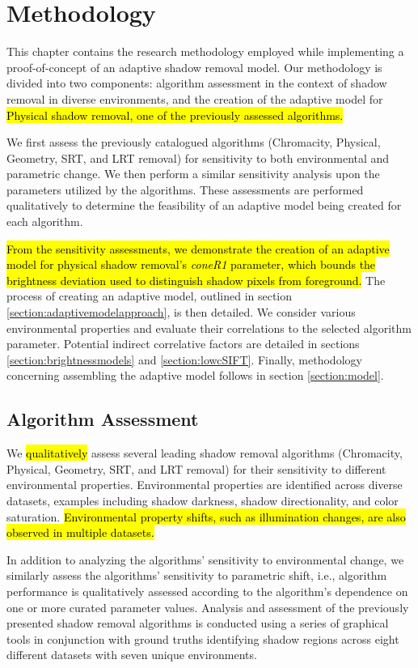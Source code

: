 \clearpage
\chapter{Methodology} \label{chapter:methodology}

This chapter contains the research methodology employed while implementing a proof-of-concept of an adaptive shadow removal model. Our methodology is divided into two components: algorithm assessment in the context of shadow removal in diverse environments, and the creation of the adaptive model for \hl{Physical shadow removal, one of the previously assessed algorithms.} 

We first assess the previously catalogued algorithms (Chromacity, Physical, Geometry, SRT, and LRT removal) for sensitivity to both environmental and parametric change. We then perform a similar sensitivity analysis upon the parameters utilized by the algorithms. These assessments are performed qualitatively to determine the feasibility of an adaptive model being created for each algorithm.

\hl{From the sensitivity assessments, we demonstrate the creation of an adaptive model for physical shadow removal's \textit{coneR1} parameter, which bounds the brightness deviation used to distinguish shadow pixels from foreground.} The process of creating an  adaptive model, outlined in section \ref{section:adaptivemodelapproach}, is then detailed. We consider various environmental properties and evaluate their correlations to the selected algorithm parameter. Potential indirect correlative factors are detailed in sections \ref{section:brightnessmodels} and \ref{section:lowcSIFT}. Finally, methodology concerning assembling the adaptive model follows in section \ref{section:model}.

\section{Algorithm Assessment}

We \hl{qualitatively} assess several leading shadow removal algorithms (Chromacity, Physical, Geometry, SRT, and LRT removal) for their sensitivity to different environmental properties. Environmental properties are identified across diverse datasets, examples including shadow darkness, shadow directionality, and color saturation. \hl{Environmental property shifts, such as illumination changes, are also observed in multiple datasets.}

In addition to analyzing the algorithms' sensitivity to environmental change, we similarly assess the algorithms' sensitivity to parametric shift, i.e., algorithm performance is qualitatively assessed according to the algorithm's dependence on one or more curated parameter values. Analysis and assessment of the previously presented shadow removal algorithms is conducted using a series of graphical tools in conjunction with ground truths identifying shadow regions across eight different datasets with seven unique environments.


